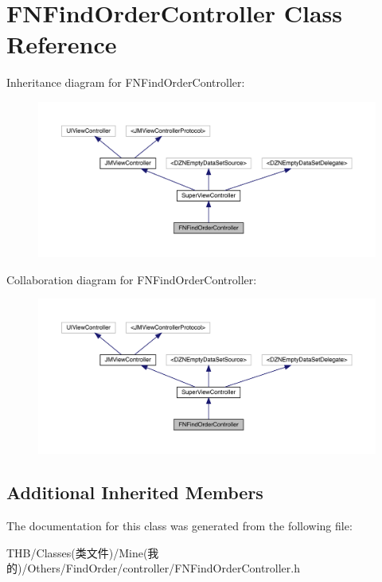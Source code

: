 \hypertarget{interface_f_n_find_order_controller}{}\section{F\+N\+Find\+Order\+Controller Class Reference}
\label{interface_f_n_find_order_controller}


Inheritance diagram for F\+N\+Find\+Order\+Controller\+:\nopagebreak
\begin{figure}[H]
\begin{center}
\leavevmode
\includegraphics[width=350pt]{interface_f_n_find_order_controller__inherit__graph}
\end{center}
\end{figure}


Collaboration diagram for F\+N\+Find\+Order\+Controller\+:\nopagebreak
\begin{figure}[H]
\begin{center}
\leavevmode
\includegraphics[width=350pt]{interface_f_n_find_order_controller__coll__graph}
\end{center}
\end{figure}
\subsection*{Additional Inherited Members}


The documentation for this class was generated from the following file\+:\begin{DoxyCompactItemize}
\item 
T\+H\+B/\+Classes(类文件)/\+Mine(我的)/\+Others/\+Find\+Order/controller/F\+N\+Find\+Order\+Controller.\+h\end{DoxyCompactItemize}
